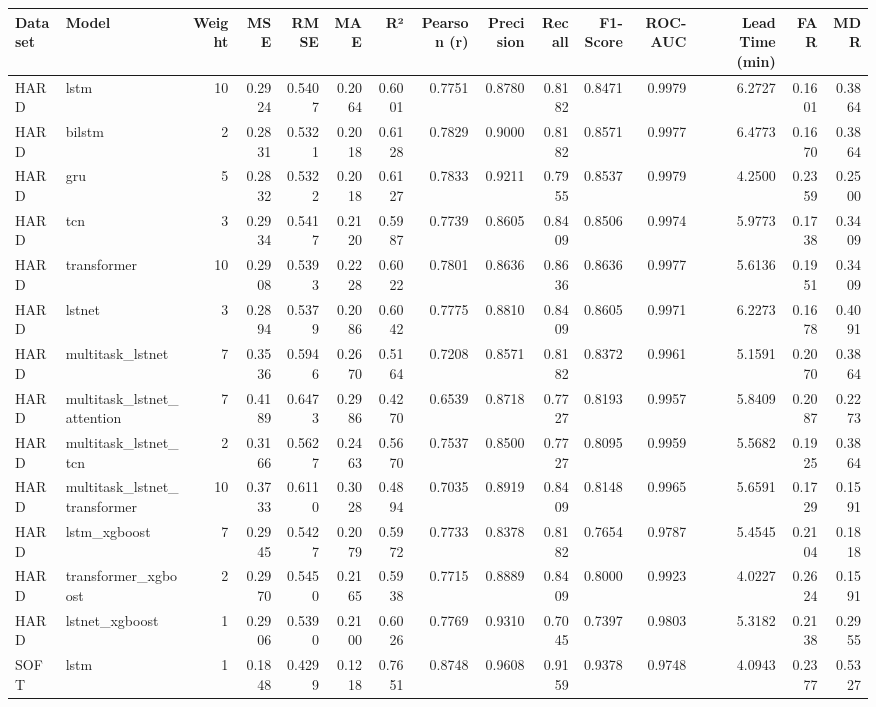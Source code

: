 \begin{tabular}{llrrrrrrrrrrrrr}
\toprule
Dataset & Model & Weight & MSE & RMSE & MAE & R² & Pearson (r) & Precision & Recall & F1-Score & ROC-AUC & Lead Time (min) & FAR & MDR \\
\midrule
HARD & lstm & 10 & 0.2924 & 0.5407 & 0.2064 & 0.6001 & 0.7751 & 0.8780 & 0.8182 & 0.8471 & 0.9979 & 6.2727 & 0.1601 & 0.3864 \\
HARD & bilstm & 2 & 0.2831 & 0.5321 & 0.2018 & 0.6128 & 0.7829 & 0.9000 & 0.8182 & 0.8571 & 0.9977 & 6.4773 & 0.1670 & 0.3864 \\
HARD & gru & 5 & 0.2832 & 0.5322 & 0.2018 & 0.6127 & 0.7833 & 0.9211 & 0.7955 & 0.8537 & 0.9979 & 4.2500 & 0.2359 & 0.2500 \\
HARD & tcn & 3 & 0.2934 & 0.5417 & 0.2120 & 0.5987 & 0.7739 & 0.8605 & 0.8409 & 0.8506 & 0.9974 & 5.9773 & 0.1738 & 0.3409 \\
HARD & transformer & 10 & 0.2908 & 0.5393 & 0.2228 & 0.6022 & 0.7801 & 0.8636 & 0.8636 & 0.8636 & 0.9977 & 5.6136 & 0.1951 & 0.3409 \\
HARD & lstnet & 3 & 0.2894 & 0.5379 & 0.2086 & 0.6042 & 0.7775 & 0.8810 & 0.8409 & 0.8605 & 0.9971 & 6.2273 & 0.1678 & 0.4091 \\
HARD & multitask_lstnet & 7 & 0.3536 & 0.5946 & 0.2670 & 0.5164 & 0.7208 & 0.8571 & 0.8182 & 0.8372 & 0.9961 & 5.1591 & 0.2070 & 0.3864 \\
HARD & multitask_lstnet_attention & 7 & 0.4189 & 0.6473 & 0.2986 & 0.4270 & 0.6539 & 0.8718 & 0.7727 & 0.8193 & 0.9957 & 5.8409 & 0.2087 & 0.2273 \\
HARD & multitask_lstnet_tcn & 2 & 0.3166 & 0.5627 & 0.2463 & 0.5670 & 0.7537 & 0.8500 & 0.7727 & 0.8095 & 0.9959 & 5.5682 & 0.1925 & 0.3864 \\
HARD & multitask_lstnet_transformer & 10 & 0.3733 & 0.6110 & 0.3028 & 0.4894 & 0.7035 & 0.8919 & 0.8409 & 0.8148 & 0.9965 & 5.6591 & 0.1729 & 0.1591 \\
HARD & lstm_xgboost & 7 & 0.2945 & 0.5427 & 0.2079 & 0.5972 & 0.7733 & 0.8378 & 0.8182 & 0.7654 & 0.9787 & 5.4545 & 0.2104 & 0.1818 \\
HARD & transformer_xgboost & 2 & 0.2970 & 0.5450 & 0.2165 & 0.5938 & 0.7715 & 0.8889 & 0.8409 & 0.8000 & 0.9923 & 4.0227 & 0.2624 & 0.1591 \\
HARD & lstnet_xgboost & 1 & 0.2906 & 0.5390 & 0.2100 & 0.6026 & 0.7769 & 0.9310 & 0.7045 & 0.7397 & 0.9803 & 5.3182 & 0.2138 & 0.2955 \\
SOFT & lstm & 1 & 0.1848 & 0.4299 & 0.1218 & 0.7651 & 0.8748 & 0.9608 & 0.9159 & 0.9378 & 0.9748 & 4.0943 & 0.2377 & 0.5327 \\

\end{tabular}
